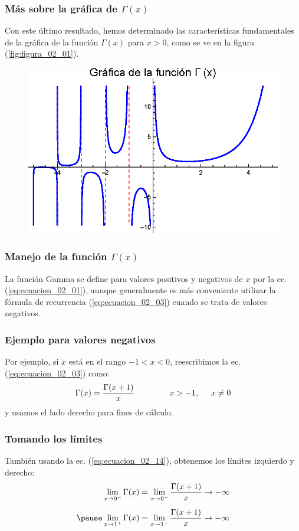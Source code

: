 \documentclass[12pt]{beamer}
\begin{document}
\begin{frame}
\frametitle{Más sobre la gráfica de $\Gamma (x)$}
Con este último resultado, hemos determinado las características fundamentales de la gráfica de la función $\Gamma (x)$ para $x > 0$, como se ve en la figura (\ref{fig:figura_02_01}).
\end{frame}
\begin{frame}[plain]
\begin{figure}[H]
    \centering
    \includegraphics[scale=1.15]{Imagenes/Plot_Gamma_01.eps}
\end{figure}
\end{frame}
\begin{frame}
\frametitle{Manejo de la función $\Gamma (x)$}
La función Gamma se define para valores positivos y negativos de $x$ por la ec. (\ref{eq:ecuacion_02_01}), \pause aunque generalmente es más conveniente utilizar la fórmula de recurrencia (\ref{eq:ecuacion_02_03}) cuando se trata de valores negativos.
\end{frame}
\begin{frame}
\frametitle{Ejemplo para valores negativos}
Por ejemplo, si $x$ está en el rango $-1 < x < 0$, reescribimos la ec. (\ref{eq:ecuacion_02_03}) como:
\pause
\begin{align}
\Gamma (x) = \dfrac{\Gamma (x + 1)}{x} \hspace{1.5cm} x > -1, \hspace{0.5cm} x \neq 0
\label{eq:ecuacion_02_14}
\end{align}
y usamos el lado derecho para fines de cálculo.
\end{frame}
\begin{frame}
\frametitle{Tomando los límites}
También usando la ec. (\ref{eq:ecuacion_02_14}), obtenemos los límites izquierdo y derecho:
\begin{eqnarray*}
\begin{aligned}
\lim_{x \to 0^{-}} \Gamma (x) &= \lim_{x \to 0^{-}} \dfrac{\Gamma (x + 1)}{x} \to -\infty \label{eq:ecuacion_02_15} \\[0.5em] \pause
\lim_{x \to 1^{+}} \Gamma (x) &= \lim_{x \to 1^{+}} \dfrac{\Gamma (x + 1)}{x} \to -\infty \label{eq:ecuacion_02_16}
\end{aligned}
\end{eqnarray*}
\end{frame}
\end{document}
